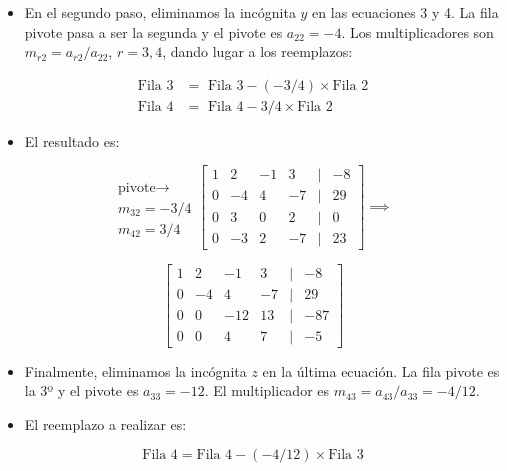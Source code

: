 \documentclass[openany]{book}
\providecommand{\tightlist}{%
  \setlength{\itemsep}{0pt}\setlength{\parskip}{0pt}}
\begin{document}
\begin{itemize}
\tightlist
\item
  En el segundo paso, eliminamos la incógnita \(y\) en las ecuaciones 3 y 4. La fila pivote pasa a ser la segunda y el pivote es \(a_{22}=-4\). Los multiplicadores son \(m_{r2}=a_{r2}/a_{22}\), \(r=3,4\), dando lugar a los reemplazos:
\end{itemize}

\[
\begin{array}{cl}
\text{Fila 3} &= \text{ Fila 3} - (-3/4) \times \text{Fila 2} \\
\text{Fila 4} &= \text{ Fila 4} - 3/4 \times \text{Fila 2} 
\end{array}
\]

\begin{itemize}
\tightlist
\item
  El resultado es:
\end{itemize}

\[
\begin{matrix}
 \\ \text{pivote} \rightarrow \\ m_{32} = -3/4 \\ m_{42} = 3/4
\end{matrix}
\begin{bmatrix}
1 & 2 & -1 & 3 &|& -8\\
0 & -4 & 4 & -7 &|& 29\\
0 & 3 & 0 & 2 &|& 0\\
0 & -3 & 2 & -7 &|& 23  
\end{bmatrix}
\implies
\]

\[
\begin{bmatrix}
1 & 2 & -1 & 3 &|& -8\\
0 & -4 & 4 & -7 &|& 29\\
0 & 0 & -12 & 13 &|& -87\\
0 & 0 & 4 & 7 &|& -5  
\end{bmatrix}
\]

\begin{itemize}
\tightlist
\item
  Finalmente, eliminamos la incógnita \(z\) en la última ecuación. La fila pivote es la 3º y el pivote es \(a_{33}=-12\). El multiplicador es \(m_{43}=a_{43}/a_{33}=-4/12\).
\item
  El reemplazo a realizar es:
\end{itemize}

\[\text{Fila } 4 = \text{Fila } 4 - (-4/12) \times \text{Fila } 3\]
\end{document}
